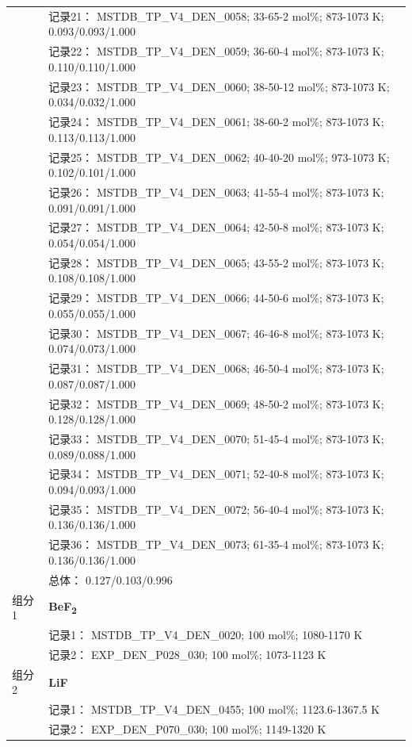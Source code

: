 \documentclass[12pt]{article}
\begin{document}
{\begin{longtable}[]{@{}
  >{\raggedright\arraybackslash}p{}
  >{\raggedright\arraybackslash}p{}@{}}
 & 记录21： MSTDB\_TP\_V4\_DEN\_0058; 33-65-2 mol\%; 873-1073 K; 0.093/0.093/1.000 \\
 & 记录22： MSTDB\_TP\_V4\_DEN\_0059; 36-60-4 mol\%; 873-1073 K; 0.110/0.110/1.000 \\
 & 记录23： MSTDB\_TP\_V4\_DEN\_0060; 38-50-12 mol\%; 873-1073 K; 0.034/0.032/1.000 \\
 & 记录24： MSTDB\_TP\_V4\_DEN\_0061; 38-60-2 mol\%; 873-1073 K; 0.113/0.113/1.000 \\
 & 记录25： MSTDB\_TP\_V4\_DEN\_0062; 40-40-20 mol\%; 973-1073 K; 0.102/0.101/1.000 \\
 & 记录26： MSTDB\_TP\_V4\_DEN\_0063; 41-55-4 mol\%; 873-1073 K; 0.091/0.091/1.000 \\
 & 记录27： MSTDB\_TP\_V4\_DEN\_0064; 42-50-8 mol\%; 873-1073 K; 0.054/0.054/1.000 \\
 & 记录28： MSTDB\_TP\_V4\_DEN\_0065; 43-55-2 mol\%; 873-1073 K; 0.108/0.108/1.000 \\
 & 记录29： MSTDB\_TP\_V4\_DEN\_0066; 44-50-6 mol\%; 873-1073 K; 0.055/0.055/1.000 \\
 & 记录30： MSTDB\_TP\_V4\_DEN\_0067; 46-46-8 mol\%; 873-1073 K; 0.074/0.073/1.000 \\
 & 记录31： MSTDB\_TP\_V4\_DEN\_0068; 46-50-4 mol\%; 873-1073 K; 0.087/0.087/1.000 \\
 & 记录32： MSTDB\_TP\_V4\_DEN\_0069; 48-50-2 mol\%; 873-1073 K; 0.128/0.128/1.000 \\
 & 记录33： MSTDB\_TP\_V4\_DEN\_0070; 51-45-4 mol\%; 873-1073 K; 0.089/0.088/1.000 \\
 & 记录34： MSTDB\_TP\_V4\_DEN\_0071; 52-40-8 mol\%; 873-1073 K; 0.094/0.093/1.000 \\
 & 记录35： MSTDB\_TP\_V4\_DEN\_0072; 56-40-4 mol\%; 873-1073 K; 0.136/0.136/1.000 \\
 & 记录36： MSTDB\_TP\_V4\_DEN\_0073; 61-35-4 mol\%; 873-1073 K; 0.136/0.136/1.000 \\
 & 总体： 0.127/0.103/0.996  \\

组分 1  & \textbf{BeF\textsubscript{2}} \\
 & 记录1： MSTDB\_TP\_V4\_DEN\_0020; 100 mol\%; 1080-1170 K \\
 & 记录2： EXP\_DEN\_P028\_030; 100 mol\%; 1073-1123 K  \\

组分 2  & \textbf{LiF} \\
 & 记录1： MSTDB\_TP\_V4\_DEN\_0455; 100 mol\%; 1123.6-1367.5 K \\
 & 记录2： EXP\_DEN\_P070\_030; 100 mol\%; 1149-1320 K  \\


\end{longtable}}
\end{document}
